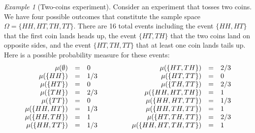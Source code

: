 \documentclass{article}
\theoremstyle{remark}
\newtheorem{example}{Example}
\newcommand{\pmeas}{\ensuremath{\mu}}
\begin{document}
\begin{example}[Two-coins experiment]\label{ex1} Consider an
  experiment that tosses two coins. We have four possible outcomes
  that constitute the sample space $\Omega=\{HH,HT,TH,TT\}$. There are
  16 total events including the event $\{HH,HT\}$ that the first coin
  lands heads up, the event $\{HT,TH\}$ that the two coins land on
  opposite sides, and the event $\{HT,TH,TT\}$ that at least one coin
  lands tails up. Here is a possible probability measure for these
  events:
\[
\begin{array}{c@{\qquad\qquad}c}
\begin{array}{rcl}
\pmeas(\emptyset) & = & 0\\
\pmeas(\{HH\}) & = & 1/3\\
\pmeas(\{HT\}) & = & 0\\
\pmeas(\{TH\}) & = & 2/3\\
\pmeas(\{TT\}) & = & 0\\
\pmeas(\{HH,HT\}) & = & 1/3\\
\pmeas(\{HH,TH\}) & = & 1\\
\pmeas(\{HH,TT\}) & = & 1/3
\end{array} & \begin{array}{rcl}
\pmeas(\{HT,TH\}) & = & 2/3\\
\pmeas(\{HT,TT\}) & = & 0\\
\pmeas(\{TH,TT\}) & = & 2/3\\
\pmeas(\{HH,HT,TH\}) & = & 1\\
\pmeas(\{HH,HT,TT\}) & = & 1/3\\
\pmeas(\{HH,TH,TT\}) & = & 1\\
\pmeas(\{HT,TH,TT\}) & = & 2/3\\
\pmeas(\{HH,HT,TH,TT\}) & = & 1
\end{array}\end{array}
\]
\end{example}
\end{document}
